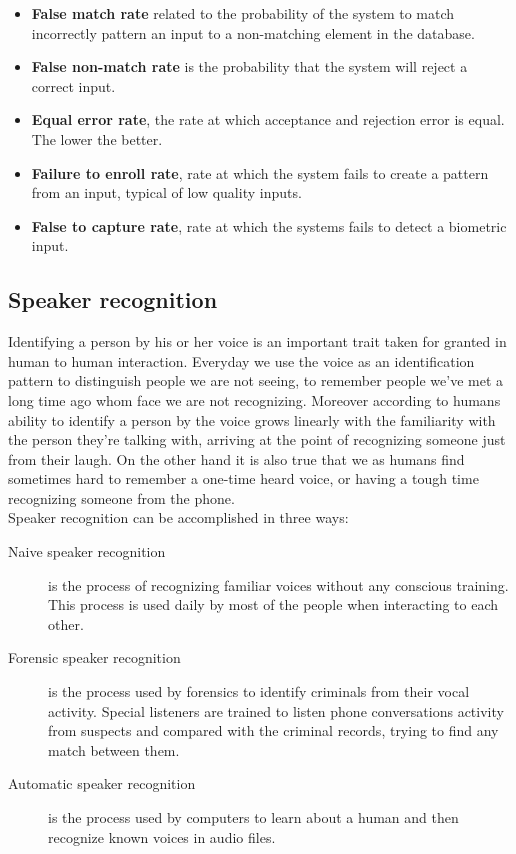 \begin{itemize}
    \item \textbf{False match rate} related to the probability of the system to
    match incorrectly pattern an input to a non-matching element in the database.
    \item \textbf{False non-match rate} is the probability that the system will reject
    a correct input.
    \item \textbf{Equal error rate}, the rate at which acceptance and rejection error is
    equal. The lower the better.
    \item \textbf{Failure to enroll rate}, rate at which the system fails to create
    a pattern from an input, typical of low quality inputs.
    \item \textbf{False to capture rate}, rate at which the systems fails to detect
    a biometric input.
\end{itemize}
\subsection{Speaker recognition}
Identifying a person by his or her voice is an important trait taken for granted
in human to human interaction.\cite{speaker-recognition} Everyday we use the voice as an identification pattern
to distinguish people we are not seeing, to remember people
we've met a long time ago whom face we are not recognizing.
Moreover according to \cite{speaker-recognition} humans ability to identify a person by the voice grows linearly
with the familiarity with the person they're talking with, arriving at the point
of recognizing someone just from their laugh. On the other hand it is
also true that we as humans find sometimes hard to remember a one-time heard voice,
or having a tough time recognizing someone from the phone.\\
Speaker recognition can be accomplished in three ways:
\begin{description}
    \item[Naive speaker recognition] is the process of recognizing familiar
    voices without any conscious training. This process is used daily by most of the people
    when interacting to each other.
    \item[Forensic speaker recognition] is the process used by forensics to identify
    criminals from their vocal activity. Special listeners are trained to listen phone
    conversations activity from suspects and compared with the criminal records, trying
    to find any match between them.
    \item[Automatic speaker recognition] is the process used by computers to learn
    about a human and then recognize known voices in audio files.
\end{description}

